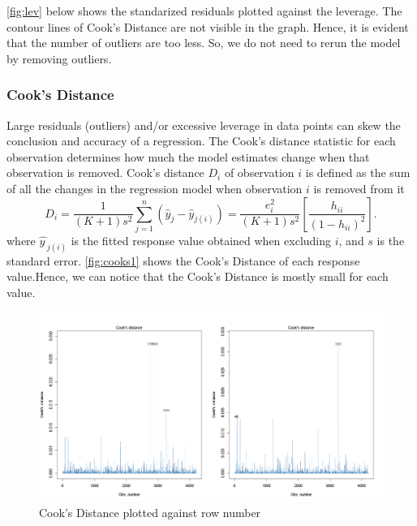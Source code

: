 \documentclass[12pt]{article}
\begin{document}
\autoref{fig:lev} below shows the standarized residuals plotted against the leverage. The contour lines of Cook's Distance are not visible in the graph. Hence, it is evident that the number of outliers are too less. So, we do not need to rerun the model by removing outliers.

\subsubsection{Cook's Distance}
Large residuals (outliers) and/or excessive leverage in data points can skew the conclusion and accuracy of a regression.
The Cook's distance statistic for each observation determines how much the model estimates change when that observation is removed.
Cook's distance $D_{i}$ of observation $i$ is defined as the sum of all the changes in the regression model when observation $i$ is removed from it
$$D_{i}={\frac {1}{(K+1)s^{2}} \sum_ {j=1}^{n}(\hat y_j-\hat y_{j(i)})}={\frac {e_{i}^{2}}{(K+1)s^{2}}}\left[{\frac {h_{ii}}{(1-h_{ii})^{2}}}\right].$$
where ${\widehat {y\, }}_{j(i)}$ is the fitted response value obtained when excluding $i$, and $s$ is the standard error.
\autoref{fig:cooks1} shows the Cook's Distance of each response value.Hence, we can notice that the Cook's Distance is mostly small for each value.
\begin{figure}[H]
    \centering
    \includegraphics[width=18cm]{3.3 images/3.3.4.2.png}
    \caption{Cook's Distance plotted against row number}
    \label{fig:cooks1}
\end{figure}
\end{document}
